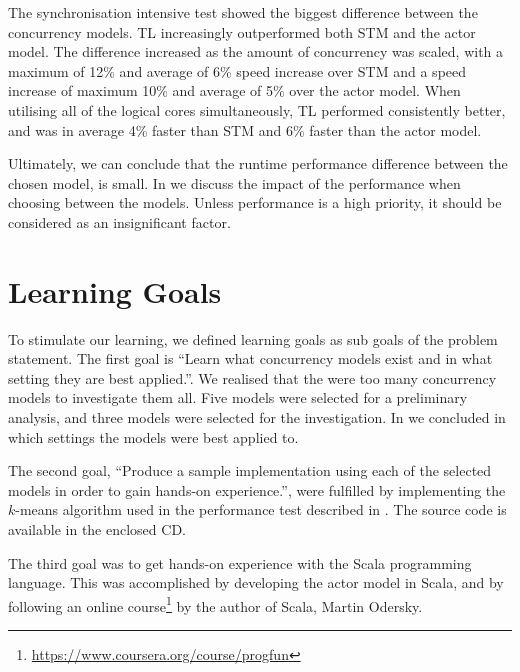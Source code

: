 The synchronisation intensive test showed the biggest difference between the concurrency models. \ac{TL} increasingly outperformed both \ac{STM} and the actor model. The difference increased as the amount of concurrency was scaled, with a maximum of 12\% and average of 6\% speed increase over \ac{STM} and a speed increase of maximum 10\% and average of 5\% over the actor model. When utilising all of the logical cores simultaneously, \ac{TL} performed consistently better, and was in average 4\% faster than \ac{STM} and 6\% faster than the actor model.

Ultimately, we can conclude that the runtime performance difference between the chosen model, is small. In  we discuss the impact of the performance when choosing between the models. Unless performance is a high priority, it should be considered as an insignificant factor.

\section{Learning Goals}
To stimulate our learning, we defined learning goals as sub goals of the problem statement. The first goal is ``Learn what concurrency models exist and in what setting they are best applied.''. We realised that the were too many concurrency models to investigate them all. Five models were selected for a preliminary analysis, and three models were selected for the investigation. In  we concluded in which settings the models were best applied to.

The second goal, ``Produce a sample implementation using each of the selected models in order to gain hands-on experience.'', were fulfilled by implementing the $k$-means algorithm used in the performance test described in . The source code is available in the enclosed CD. 

The third goal was to get hands-on experience with the Scala programming language. This was accomplished by developing the actor model in Scala, and by following an online course\footnote{\url{https://www.coursera.org/course/progfun}} by the author of Scala, Martin Odersky.
\worksheetend